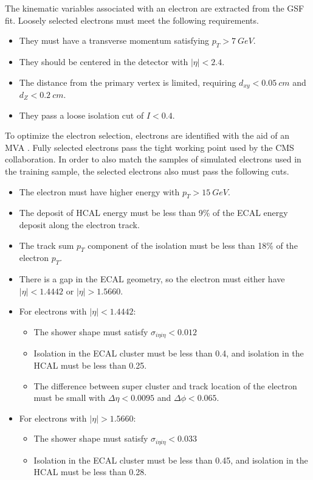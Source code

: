 The kinematic variables associated with an electron are extracted from the GSF fit.
Loosely selected electrons must meet the following requirements.
\begin{itemize}
\item They must have a transverse momentum satisfying $p_T > \SI{7}{GeV}$.
\item They should be centered in the detector with $|\eta| < 2.4$.
\item The distance from the primary vertex is limited, requiring
  $d_{xy} < \SI{0.05}{cm}$ and $d_Z < \SI{0.2}{cm}$.
\item They pass a loose isolation cut of $I < 0.4$.
\end{itemize}
To optimize the electron selection,
electrons are identified with the aid of an MVA \cite{Rembser_2019}.
Fully selected electrons pass the tight working point used by the CMS collaboration.
In order to also match the samples of simulated electrons used in the training sample,
the selected electrons also must pass the following cuts.
\begin{itemize}
\item The electron must have higher energy with $p_T > \SI{15}{GeV}$.
\item The deposit of HCAL energy must be less than 9\% of the ECAL energy deposit
  along the electron track.
\item The track sum $p_T$ component of the isolation must be
  less than 18\% of the electron $p_T$.
\item There is a gap in the ECAL geometry,
  so the electron must either have $|\eta| < 1.4442$ or $|\eta| > 1.5660$.
\item For electrons with $|\eta| < 1.4442$:
  \begin{itemize}
  \item The shower shape must satisfy $\sigma_{i\eta i\eta} < 0.012$
  \item Isolation in the ECAL cluster must be less than 0.4,
    and isolation in the HCAL must be less than 0.25.
  \item The difference between super cluster and track location of the electron
    must be small with $\Delta \eta < 0.0095$ and $\Delta \phi < 0.065$.
  \end{itemize}
\item For electrons with $|\eta| > 1.5660$:
  \begin{itemize}
  \item The shower shape must satisfy $\sigma_{i\eta i\eta} < 0.033$
  \item Isolation in the ECAL cluster must be less than 0.45,
    and isolation in the HCAL must be less than 0.28.
  \end{itemize}
\end{itemize}

